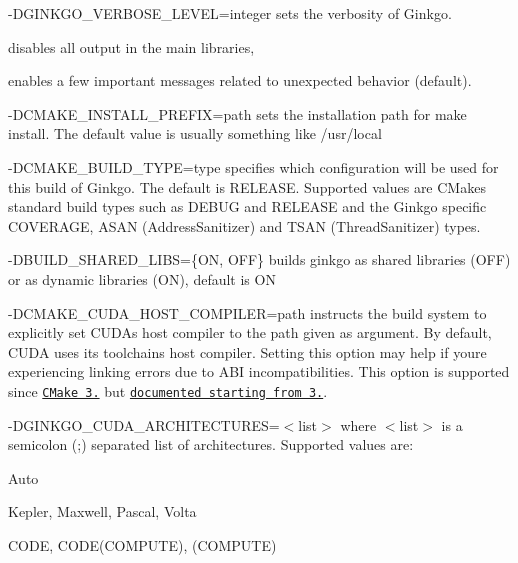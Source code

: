\begin{DoxyItemize}
\item {\ttfamily -\/\+D\+G\+I\+N\+K\+G\+O\+\_\+\+V\+E\+R\+B\+O\+S\+E\+\_\+\+L\+E\+V\+EL=integer} sets the verbosity of Ginkgo.
\begin{DoxyItemize}
\item {} disables all output in the main libraries,
\item {} enables a few important messages related to unexpected behavior (default).
\end{DoxyItemize}
\item {\ttfamily -\/\+D\+C\+M\+A\+K\+E\+\_\+\+I\+N\+S\+T\+A\+L\+L\+\_\+\+P\+R\+E\+F\+IX=path} sets the installation path for {\ttfamily make install}. The default value is usually something like {\ttfamily /usr/local}
\item {\ttfamily -\/\+D\+C\+M\+A\+K\+E\+\_\+\+B\+U\+I\+L\+D\+\_\+\+T\+Y\+PE=type} specifies which configuration will be used for this build of Ginkgo. The default is {\ttfamily R\+E\+L\+E\+A\+SE}. Supported values are C\+Make\textquotesingle{}s standard build types such as {\ttfamily D\+E\+B\+UG} and {\ttfamily R\+E\+L\+E\+A\+SE} and the Ginkgo specific {\ttfamily C\+O\+V\+E\+R\+A\+GE}, {\ttfamily A\+S\+AN} (Address\+Sanitizer) and {\ttfamily T\+S\+AN} (Thread\+Sanitizer) types.
\item {\ttfamily -\/\+D\+B\+U\+I\+L\+D\+\_\+\+S\+H\+A\+R\+E\+D\+\_\+\+L\+I\+BS=\{ON, O\+FF\}} builds ginkgo as shared libraries ({\ttfamily O\+FF}) or as dynamic libraries ({\ttfamily ON}), default is {\ttfamily ON}
\item {\ttfamily -\/\+D\+C\+M\+A\+K\+E\+\_\+\+C\+U\+D\+A\+\_\+\+H\+O\+S\+T\+\_\+\+C\+O\+M\+P\+I\+L\+ER=path} instructs the build system to explicitly set C\+U\+DA\textquotesingle{}s host compiler to the path given as argument. By default, C\+U\+DA uses its toolchain\textquotesingle{}s host compiler. Setting this option may help if you\textquotesingle{}re experiencing linking errors due to A\+BI incompatibilities. This option is supported since \href{https://github.com/Kitware/CMake/commit/489c52ce680df6439f9c1e553cd2925ca8944cb1}{\tt C\+Make 3.} but \href{https://cmake.org/cmake/help/v3.10/variable/CMAKE_CUDA_HOST_COMPILER.html}{\tt documented starting from 3.}.
\item {\ttfamily -\/\+D\+G\+I\+N\+K\+G\+O\+\_\+\+C\+U\+D\+A\+\_\+\+A\+R\+C\+H\+I\+T\+E\+C\+T\+U\+R\+ES=$<$list$>$} where {\ttfamily $<$list$>$} is a semicolon ({\ttfamily ;}) separated list of architectures. Supported values are\+:
\begin{DoxyItemize}
\item {\ttfamily Auto}
\item {\ttfamily Kepler}, {\ttfamily Maxwell}, {\ttfamily Pascal}, {\ttfamily Volta}
\item {\ttfamily C\+O\+DE}, {\ttfamily C\+O\+D\+E(\+C\+O\+M\+P\+U\+T\+E)}, {\ttfamily (C\+O\+M\+P\+U\+TE)}
\end{DoxyItemize}


\end{DoxyItemize}
